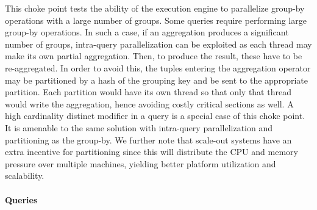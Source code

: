 
This choke point tests the ability of the execution engine to parallelize
group-by operations with a large number of groups. Some queries require
performing large group-by operations. In such a case, if an aggregation produces
a significant number of groups, intra-query parallelization can be exploited as
each thread may make its own partial aggregation. Then, to produce the result,
these have to be re-aggregated. In order to avoid this, the tuples entering the
aggregation operator may be partitioned by a hash of the grouping key and be
sent to the appropriate partition. Each partition would have its own thread so
that only that thread would write the aggregation, hence avoiding costly
critical sections as well. A high cardinality distinct modifier in a query is a
special case of this choke point. It is amenable to the same solution with
intra-query parallelization and partitioning as the group-by. We further note
that scale-out systems have an extra incentive for partitioning since this will
distribute the CPU and memory pressure over multiple machines, yielding better
platform utilization and scalability.


\paragraph{Queries}
{\raggedright
}